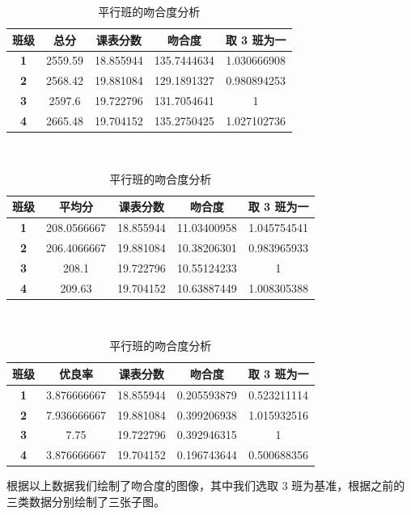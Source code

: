 \documentclass[a4paper]{article}
\begin{document}
  \begin{table}[H]
  \centering
  \begin{tabular}{ccccc}
  \toprule
  \bf 班级 & \bf 总分 & \bf 课表分数 & \bf 吻合度 & \bf 取 3 班为一 \\
  \midrule
  \bf 1 & 2559.59 & 18.855944 & 135.7444634 & 1.030666908 \\
  \bf 2 & 2568.42 & 19.881084 & 129.1891327 & 0.980894253 \\
  \bf 3 & 2597.6 & 19.722796 & 131.7054641 & 1 \\
  \bf 4 & 2665.48 & 19.704152 & 135.2750425 & 1.027102736 \\
  \bottomrule
  \end{tabular}\\[2mm]

  \begin{tabular}{ccccc}
  \toprule
  \bf 班级 & \bf 平均分 & \bf 课表分数 & \bf 吻合度 & \bf 取 3 班为一 \\
  \midrule
  \bf 1 & 208.0566667 & 18.855944 & 11.03400958 & 1.045754541 \\
  \bf 2 & 206.4066667 & 19.881084 & 10.38206301 & 0.983965933 \\
  \bf 3 & 208.1 & 19.722796 & 10.55124233 & 1 \\
  \bf 4 & 209.63 & 19.704152 & 10.63887449 & 1.008305388 \\
  \bottomrule
  \end{tabular}\\[2mm]

  \begin{tabular}{ccccc}
  \toprule
  \bf 班级 & \bf 优良率 & \bf 课表分数 & \bf 吻合度 & \bf 取 3 班为一 \\
  \midrule
  \bf 1 & 3.876666667 & 18.855944 & 0.205593879 & 0.523211114 \\
  \bf 2 & 7.936666667 & 19.881084 & 0.399206938 & 1.015932516 \\
  \bf 3 & 7.75 & 19.722796 & 0.392946315 & 1 \\
  \bf 4 & 3.876666667 & 19.704152 & 0.196743644 & 0.500688356 \\
  \bottomrule
  \end{tabular}
  \caption{平行班的吻合度分析}
  \end{table}

  根据以上数据我们绘制了吻合度的图像，其中我们选取 3 班为基准，根据之前的三类数据分别绘制了三张子图。
\end{document}
